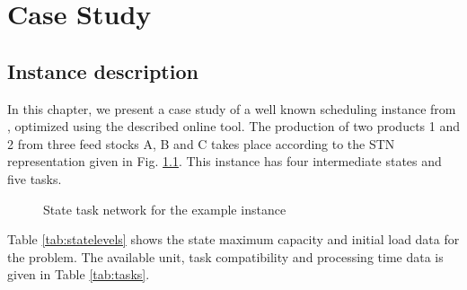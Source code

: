 \chapter{Case Study}
\thispagestyle{plain}

\section{Instance description}
In this chapter, we present a case study of a well known scheduling instance from \cite{KONDILI1993211}, optimized using the described online tool. The production of two products 1 and 2 from three feed stocks A, B and C takes place according to the STN representation given in Fig. \ref{fig:STN}. This instance has four intermediate states and five tasks.

\begin{figure}[htbp]
\centering
{}
\caption{State task network for the example instance}
\label{fig:STN}
\end{figure}

Table \ref{tab:statelevels} shows the state maximum capacity and initial load data for the problem. The available unit, task compatibility and processing time data is given in Table \ref{tab:tasks}.


